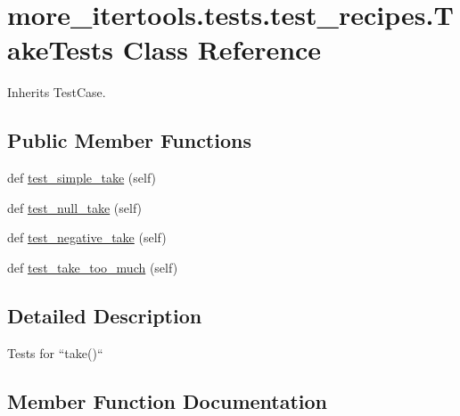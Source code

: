 \hypertarget{classmore__itertools_1_1tests_1_1test__recipes_1_1_take_tests}{}\section{more\+\_\+itertools.\+tests.\+test\+\_\+recipes.\+Take\+Tests Class Reference}
\label{classmore__itertools_1_1tests_1_1test__recipes_1_1_take_tests}


Inherits Test\+Case.

\subsection*{Public Member Functions}
\begin{DoxyCompactItemize}
\item 
def \hyperlink{classmore__itertools_1_1tests_1_1test__recipes_1_1_take_tests_ac4b5349c47612f4d35baeadc725642d8}{test\+\_\+simple\+\_\+take} (self)
\item 
def \hyperlink{classmore__itertools_1_1tests_1_1test__recipes_1_1_take_tests_a1d6c3dae8e507415def4086b010b8b20}{test\+\_\+null\+\_\+take} (self)
\item 
def \hyperlink{classmore__itertools_1_1tests_1_1test__recipes_1_1_take_tests_aa3437502d07f363c0c34ef7eb26e2b37}{test\+\_\+negative\+\_\+take} (self)
\item 
def \hyperlink{classmore__itertools_1_1tests_1_1test__recipes_1_1_take_tests_a48e86ce8a8ee977dedc09c5c78a8766c}{test\+\_\+take\+\_\+too\+\_\+much} (self)
\end{DoxyCompactItemize}


\subsection{Detailed Description}
\begin{DoxyVerb}Tests for ``take()``\end{DoxyVerb}
 

\subsection{Member Function Documentation}
\mbox{\label{classmore__itertools_1_1tests_1_1test__recipes_1_1_take_tests_aa3437502d07f363c0c34ef7eb26e2b37}} 
